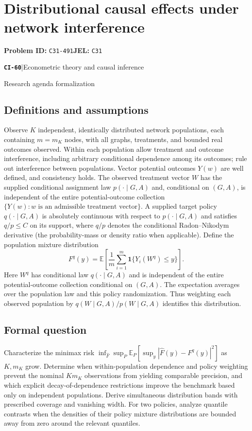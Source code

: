 \documentclass[11pt,a4paper]{article}
\newcommand{\E}{\mathbb E}
\newcommand{\ind}{\mathbf 1}
\newcommand{\entrymeta}[3]{{\sffamily\small\color{muted}\textbf{\texttt{#1}}\quad|\quad #2\par #3\par}}
\begin{document}
\section*{Distributional causal effects under network interference}
\textbf{Problem ID:} \texttt{C31-491}\quad \textbf{JEL:} \texttt{C31}\par
\label{problem:OP-0539}
\label{beyond:CI-60}
\entrymeta{CI-60}{Econometric theory and causal inference}{Research agenda formalization}
\subsection*{Definitions and assumptions}
Observe $K$ independent, identically distributed network populations, each containing $m=m_K$ nodes, with all graphs, treatments, and bounded real outcomes observed. Within each population allow treatment and outcome interference, including arbitrary conditional dependence among its outcomes; rule out interference between populations. Vector potential outcomes $Y(w)$ are well defined, and consistency holds. The observed treatment vector $W$ has the supplied conditional assignment law $p(\cdot\mid G,A)$ and, conditional on $(G,A)$, is independent of the entire potential-outcome collection $\{Y(w):w\text{ is an admissible treatment vector}\}$. A supplied target policy $q(\cdot\mid G,A)$ is absolutely continuous with respect to $p(\cdot\mid G,A)$ and satisfies $q/p\leq C$ on its support, where $q/p$ denotes the conditional Radon--Nikodym derivative (the probability-mass or density ratio when applicable). Define the population mixture distribution
\[
 F^q(y)=\E\!\left[\frac1m\sum_{i=1}^m
                   \ind\{Y_i(W^q)\leq y\}\right].
\]
Here $W^q$ has conditional law $q(\cdot\mid G,A)$ and is independent of the entire potential-outcome collection conditional on $(G,A)$. The expectation averages over the population law and this policy randomization. Thus weighting each observed population by $q(W\mid G,A)/p(W\mid G,A)$ identifies this distribution.
\subsection*{Formal question}
Characterize the minimax risk $\inf_{\widehat F}\sup_P
\E_P[\sup_y|\widehat F(y)-F^q(y)|^2]$ as $K,m_K$ grow. Determine when within-population dependence and policy weighting prevent the nominal $Km_K$ observations from yielding comparable precision, and which explicit decay-of-dependence restrictions improve the benchmark based only on independent populations. Derive simultaneous distribution bands with prescribed coverage and vanishing width. For two policies, analyze quantile contrasts when the densities of their policy mixture distributions are bounded away from zero around the relevant quantiles.
\end{document}
